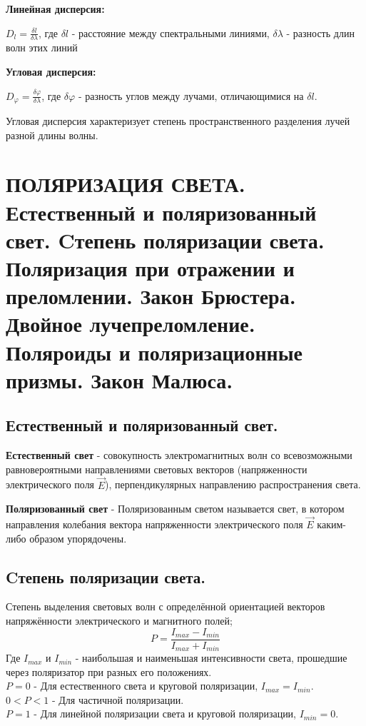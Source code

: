 \documentclass[12pt]{report}
\begin{document}
\textbf{Линейная дисперсия:}\par
$D_{l} = \frac{\delta l}{\delta \lambda}$, где $\delta l$ - расстояние между спектральными линиями, $\delta \lambda$ - разность длин волн этих линий\par
\textbf{Угловая дисперсия:}\par
$D_{\varphi} = \frac{\delta \varphi}{\delta \lambda}$, где $\delta \varphi$ - разность углов между лучами, отличающимися на $\delta l$.\par
Угловая дисперсия характеризует степень пространственного разделения лучей разной длины волны.

\setcounter{section}{29}

\section{ПОЛЯРИЗАЦИЯ СВЕТА. Естественный и поляризованный свет. Cтепень поляризации света. Поляризация при отражении и преломлении. Закон Брюстера. Двойное лучепреломление. Поляроиды и поляризационные призмы. Закон Малюса.}
\subsection{  Естественный и поляризованный свет.}
\textbf{Естественный свет} - совокупность электромагнитных волн со всевозможными равновероятными направлениями световых векторов (напряженности электрического поля $\overrightarrow{E}$), перпендикулярных направлению распространения света.

\textbf{Поляризованный свет} -  Поляризованным светом называется свет, в котором направления колебания вектора напряженности электрического поля $\overrightarrow{E}$  каким-либо образом упорядочены.
\subsection{  Cтепень поляризации света.}
Степень выделения световых волн с определённой ориентацией векторов напряжённости электрического и магнитного полей;
\[P=\frac{I_{max}-I_{min}}{I_{max}+I_{min}}\]
Где $I_{max}$ и $I_{min}$ - наибольшая и наименьшая интенсивности света, прошедшие через поляризатор при разных его положениях.\\
$P=0$ - Для естественного света и круговой поляризации, $I_{max}=I_{min}$.\\
$0<P<1$ - Для частичной поляризации.\\
$P=1$ - Для  линейной поляризации света и круговой поляризации,  $I_{min}=0$.
\end{document}
